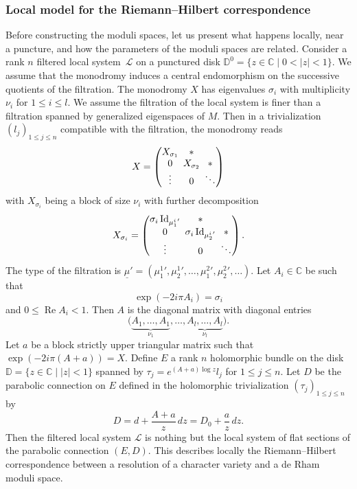 \documentclass[JEP,XML,SOM,NoEqCountersInSection,Unicode,published]{cedram}
\theoremstyle{definition}
\theoremstyle{plain}
\DeclareMathOperator{\Id}{Id}
\DeclareMathOperator{\Ree}{Re}
\newcommand{\C}{\mathbb{C}}
\begin{document}
\subsubsection{Local model for the Riemann--Hilbert correspondence}\label{subsub_local_RH}
Before constructing the moduli spaces, let us present what happens locally, near a puncture, and how the parameters of the moduli spaces are related. Consider a rank $n$ filtered local system~$\mathcal{L}$ on a punctured disk $\mathbb{D}^0=\lbrace z\in \mathbb{C} \mid 0 < |z|< 1\rbrace$. We assume that the monodromy induces a central endomorphism on the successive quotients of the filtration. The monodromy $X$ has eigenvalues $\sigma_i$ with multiplicity $\nu_i$ for $1\le i \le l$. We assume the filtration of the local system is finer than a filtration spanned by generalized eigenspaces of $M$. Then in a trivialization $(l_j)_{1\le j \le n}$ compatible with the filtration, the monodromy reads
\[\arraycolsep2.5pt
X =
\begin{pmatrix}
X_{\sigma_1} & *& \\
0 & X_{\sigma_2} & *\\
\vdots & 0 & \ddots
\end{pmatrix}
\]
with $X_{\sigma_i}$ being a block of size $\nu_i$ with further decomposition
\[\arraycolsep2.5pt
X_{\sigma_i} =
\begin{pmatrix}
\sigma_i \Id_{{\mu^i_1}'} & *& \\
0 & \sigma_i \Id_{{\mu^i_2}'} & *\\
\vdots & 0 & \ddots
\end{pmatrix}.
\]
The type of the filtration is $\underline{\mu}'=({\mu^1_1}',{\mu^1_2}',\dots,{\mu^2_1}',{\mu^2_2}',\dots)$. Let $A_i \in \C$ be such that
\[
\exp(- 2 i \pi A_i)=\sigma_i
\]
and $0 \le \Ree A_i<1$. Then $A$ is the diagonal matrix with diagonal entries
\[
\bigl(\underbrace{A_1,\dots,A_1}_{\nu_1},\dots,\underbrace{A_l,\dots,A_l}_{\nu_l}\bigr).
\]
Let $a$ be a block strictly upper triangular matrix such that $\exp\left(-2i\pi (A+a)\right)=X$. Define $E$ a rank $n$ holomorphic bundle on the disk $\mathbb{D}=\lbrace z\in\mathbb{C} \mid |z|<1\rbrace$ spanned by $\tau_j=e^{(A+a) \log z} l_j$ for $1\le j\le n$. Let $D$ be the parabolic connection on $E$ defined in the holomorphic trivialization $(\tau_j)_{1\le j\le n}$ by
\[
D = d + \frac{A+a}{z}\, dz = D_0 + \frac{a}{z}\, dz.
\]
Then the filtered local system $\mathcal{L}$ is nothing but the local system of flat sections of the parabolic connection $(E,D)$. This describes locally the Riemann--Hilbert correspondence between a resolution of a character variety and a de Rham moduli space.
\end{document}
